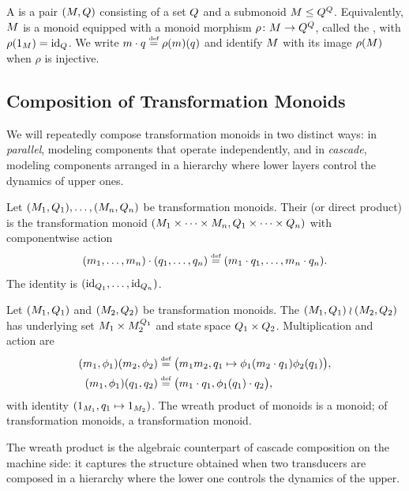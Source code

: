 \documentclass{article}
\begin{document}
\begin{definition}
A  is a pair $(M, Q)$ consisting of a set $Q$ and a submonoid $M \leq Q^Q$. Equivalently, $M$ is a monoid equipped with a monoid morphism $\rho \colon M \to Q^Q$, called the , with $\rho(1_M) = \mathrm{id}_{Q}$. 
We write $m \cdot q \mathrel{\stackrel{\textnormal{\tiny def}}{=}} \rho(m)(q)$ and identify $M$ with its image $\rho(M)$ when $\rho$ is injective.
\end{definition}

\subsection{Composition of Transformation Monoids}

We will repeatedly compose transformation monoids in two distinct ways: in \emph{parallel}, modeling components that operate independently, and in \emph{cascade}, modeling components arranged in a hierarchy where lower layers control the dynamics of upper ones.

\begin{definition}\label{def:parallel-comp}
Let $(M_1, Q_1), \ldots, (M_n, Q_n)$ be transformation monoids.
Their  (or direct product) is the transformation monoid
$(M_1 \times \cdots \times M_n, Q_1 \times \cdots \times Q_n)$
with componentwise action
$$
(m_1, \ldots, m_n) \cdot (q_1, \ldots, q_n) \mathrel{\stackrel{\textnormal{\tiny def}}{=}} (m_1 \cdot q_1, \ldots, m_n \cdot q_n).
$$
The identity is $(\mathrm{id}_{Q_1}, \ldots, \mathrm{id}_{Q_n})$.
\end{definition}

\begin{definition}\label{def:wreath}
Let $(M_1, Q_1)$ and $(M_2, Q_2 )$ be transformation monoids. 
The  $(M_1, Q_1) \wr (M_2, Q_2)$ has underlying set $M_1\times M_2^{Q_1}$ and state space $Q_1 \times Q_2$. 
Multiplication and action are
\begin{align*}
(m_1, \phi_1)  (m_2, \phi_2) & \mathrel{\stackrel{\textnormal{\tiny def}}{=}} \bigl(m_1 m_2, q_1 \mapsto \phi_1(m_2 \cdot q_1)  \phi_2(q_1) \bigr), \\
(m_1, \phi_1)  (q_1, q_2) & \mathrel{\stackrel{\textnormal{\tiny def}}{=}} \bigl(m_1 \cdot q_1, \phi_1(q_1) \cdot q_2\bigr),
\end{align*}
with identity $(1_{M_1}, q_1 \mapsto 1_{M_2})$. 
The wreath product of monoids is a monoid; of transformation monoids, a transformation monoid.
\end{definition}
The wreath product is the algebraic counterpart of cascade composition on the machine side: it captures the structure obtained when two transducers are composed in a hierarchy where the lower one controls the dynamics of the upper.
\end{document}
